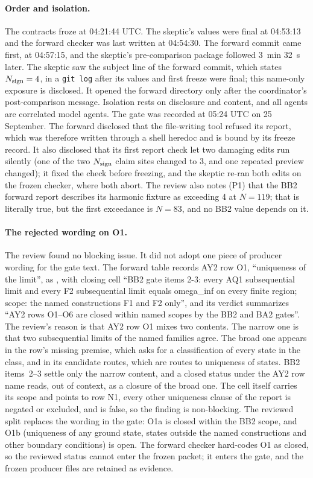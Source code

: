 \paragraph{Order and isolation.} The contracts froze at 04:21:44 UTC. The
skeptic's values were final at 04:53:13 and the forward checker was last
written at 04:54:30. The forward commit came first, at 04:57:15, and the
skeptic's pre-comparison package followed 3~min 32~s later. The skeptic saw
the subject line of the forward commit, which states $N_{\rm sign}=4$, in a
\texttt{git log} after its values and first freeze were final; this
name-only exposure is disclosed. It opened the forward directory only after
the coordinator's post-comparison message. Isolation rests on disclosure and
content, and all agents are correlated model agents. The gate was recorded at
05:24 UTC on 25 September. The forward disclosed that the file-writing tool
refused its report, which was therefore written through a shell heredoc and is
bound by its freeze record. It also disclosed that its first report check let
two damaging edits run silently (one of the two $N_{\rm sign}$ claim sites
changed to 3, and one repeated preview changed); it fixed the check before
freezing, and the skeptic re-ran both edits on the frozen checker, where
both abort. The review also notes (P1) that the BB2 forward report describes
its harmonic fixture as exceeding 4 at $N=119$; that is literally true, but
the first exceedance is $N=83$, and no BB2 value depends on it.

\paragraph{The rejected wording on O1.} The review found no blocking issue.
It did not adopt one piece of producer wording for the gate text. The forward
table records AY2 row O1, ``uniqueness of the limit'', as
, with closing cell ``BB2 gate items 2-3: every AQ1
subsequential limit and every F2 subsequential limit equals omega\_inf on
every finite region; scope: the named constructions F1 and F2 only'', and its
verdict summarizes ``AY2 rows O1--O6 are closed within named scopes by the
BB2 and BA2 gates''. The review's reason is that AY2 row O1 mixes two
contents. The narrow one is that two subsequential limits of the named
families agree. The broad one appears in the row's missing premise, which
asks for a classification of every state in the class, and in its candidate
routes, which are routes to uniqueness of states. BB2 items~2--3 settle only
the narrow content, and a closed status under the AY2 row name reads, out of
context, as a closure of the broad one. The cell itself carries its scope and
points to row N1, every other uniqueness clause of the report is negated or
excluded, and  is false, so the
finding is non-blocking. The reviewed split replaces the wording in the gate:
O1a is closed within the BB2 scope, and O1b (uniqueness of any ground state,
states outside the named constructions and other boundary conditions) is
open. The forward checker hard-codes O1 as closed, so the reviewed status
cannot enter the frozen packet; it enters the gate, and the frozen producer
files are retained as evidence.

